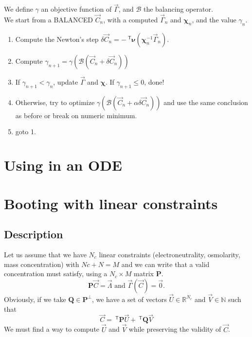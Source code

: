 \documentclass[aps]{revtex4}
\newcommand{\mymat}[1]{\bm{#1}}
\newcommand{\mytrn}[1]{~^{\mathsf{T}}{#1}}
\begin{document}
We define  $\gamma$ an
objective function of $\vec{\Gamma}$, and $\mathcal{B}$ the balancing operator.\\
We start from a BALANCED $\vec{C}_n$, with a computed $\vec{\Gamma}_n$ and $\mymat{\chi}_n$, and
the value $\gamma_n$.\\

\begin{enumerate}
\item Compute the Newton's step $\delta\vec{C}_n = - \mytrn{\mymat{\nu}}\left(\mymat{\chi}_n^{-1} \vec{\Gamma}_{n}\right)$.
\item Compute $\gamma_{n+1}=\gamma\left(\mathcal{B}\left(\vec{C}_n+\delta\vec{C}_n\right)\right)$
\item If $\gamma_{n+1}<\gamma_{n}$, update $\vec{\Gamma}$ and $\mymat{\chi}$. If $\gamma_{n+1}\leq 0$, done!
\item Otherwise, try to optimize $\gamma\left(\mathcal{B}\left(\vec{C}_n+\alpha\delta\vec{C}_n\right)\right)$ and use the same conclusion as before or break on numeric minimum.
\item goto 1.
\end{enumerate}

\section{Using in an ODE}

\section{Booting with linear constraints}
\subsection{Description}
Let us assume that we have $N_c$ linear constraints (electroneutrality, osmolarity, mass concentration) with $Nc+N=M$
and we can write that a valid concentration must satisfy, using a $N_c\times M$ matrix $\mymat{P}$. 
\begin{equation}
	\mymat{P} \vec{C} = \vec{\Lambda} \text{ and } \vec{\Gamma}\left(\vec{C}\right) = \vec{0}.
\end{equation}
Obviously, if we take $\mymat{Q}\in\mymat{P}^{\perp}$, we have a set of vectors $\vec{U}\in\mathbb{R}^{N_c}$ and $\vec{V}\in\mathbb{N}$ such that
\begin{equation}
	\vec{C} = \mytrn{\mymat{P}} \vec{U} + \mytrn{\mymat{Q}} \vec{V}
\end{equation}
We must find a way to compute $\vec{U}$ and $\vec{V}$ while preserving the validity of $\vec{C}$.
\end{document}
